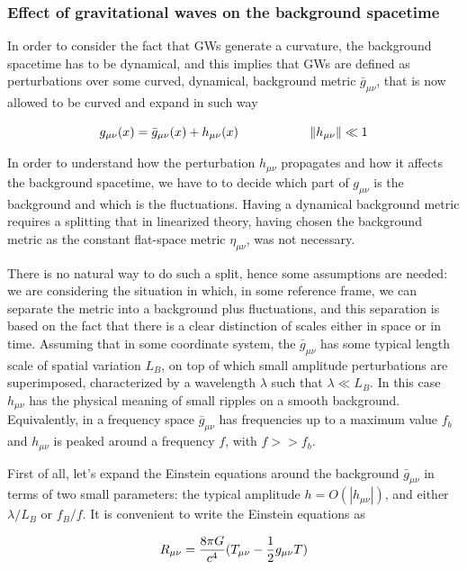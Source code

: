 \documentclass[binding=0.6cm, LaM]{sapthesis}
\begin{document}
\subsubsection{Effect of gravitational waves on the background spacetime}

	In order to consider the fact that GWs generate a curvature, the background spacetime has to be dynamical, 
	and this implies that GWs are defined as perturbations over some curved, dynamical, 
	background metric $\bar g_{\mu \nu}$, that is now allowed to be curved and expand in such way

		\begin{equation}
		g_{\mu \nu}(x) = \bar g_{\mu \nu}(x) + h_{\mu \nu}(x) \hspace*{2cm}\|h_{\mu\nu}\|\ll 1
		\end{equation}

	In order to understand how the perturbation $h_{\mu \nu}$ propagates and how it affects the background spacetime, 
	we have to to decide which part of $g_{\mu\nu}$ is the background and which is the fluctuations. 
	Having a dynamical background metric requires a splitting that in linearized theory, 
	having chosen the background metric as the constant flat-space metric $\eta_{\mu\nu}$, was not necessary.

	There is no natural way to do such a split, hence some assumptions are needed: we are considering the situation in which, 
	in some reference frame, we can separate the metric into a background plus fluctuations, 
	and this separation is based on the fact that there is a clear distinction of scales either in space or in time.
	Assuming that in some coordinate system, the $\bar g_{\mu \nu}$ has some typical length scale of spatial variation $L_B$, 
	on top of which small amplitude perturbations are superimposed, characterized by a wavelength $\lambda$ such that $\lambda \ll L_B$. 
	In this case $h_{\mu\nu}$ has the physical meaning of small ripples on a smooth background.
	Equivalently, in a frequency space $\bar g_{\mu\nu}$ has frequencies up to a maximum value $f_b$ and  $h_{\mu\nu}$  
	is peaked around a frequency $f$, with $f >> f_b$.

	First of all, let's expand the Einstein equations around the background $\bar g_{\mu \nu}$ in terms of two small parameters: 
	the typical amplitude $h= O(|h_{\mu\nu}|)$, and either $\lambda/L_B$ or $f_B/f$.
	It is convenient to write the Einstein equations as

		\begin{equation}
		R_{\mu\nu} = {{8\pi G}\over c^4}(T_{\mu\nu}- {1 \over 2}g_{\mu\nu}T) 
		\end{equation}
\end{document}
